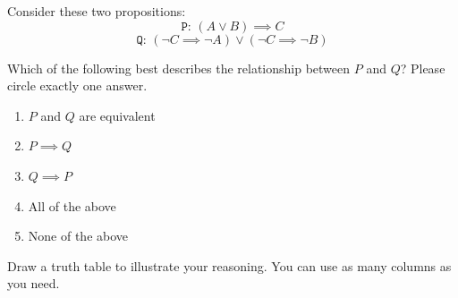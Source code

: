 \documentclass[12pt,oneside]{article}
\begin{document}
\begin{problem}{10}

Consider these two propositions:
$$\texttt{P: } (A \vee B) \implies C$$
$$\texttt{Q: } (\neg C \implies \neg A) \vee (\neg C \implies \neg B)$$ 

Which of the following best describes the relationship between $P$ and $Q$?  Please circle exactly one answer.

\begin{enumerate}
\item
$P$ and $Q$ are equivalent
\item
$P \implies Q$
\item
$Q \implies P$
\item
All of the above
\item
None of the above
\end{enumerate}

Draw a truth table to illustrate your reasoning. You can use as many columns as you need.



\end{problem}

\newpage
\end{document}
